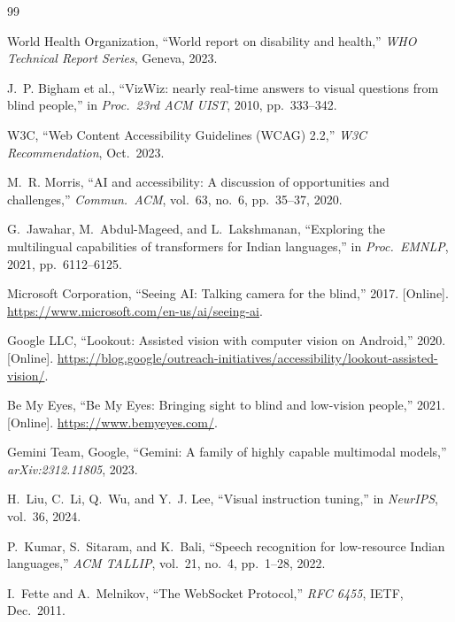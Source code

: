 \documentclass[pdflatex,sn-mathphys-num]{sn-jnl}
\theoremstyle{thmstyleone}%
\theoremstyle{thmstyletwo}%
\theoremstyle{thmstylethree}%
\begin{document}
\begin{thebibliography}{99}

World Health Organization, ``World report on disability and health,''
\textit{WHO Technical Report Series}, Geneva, 2023.

J.~P. Bigham et al., ``VizWiz: nearly real-time answers to visual questions
from blind people,'' in \textit{Proc.\ 23rd ACM UIST}, 2010, pp.\ 333--342.

W3C, ``Web Content Accessibility Guidelines (WCAG) 2.2,''
\textit{W3C Recommendation}, Oct.\ 2023.

M.~R. Morris, ``AI and accessibility: A discussion of opportunities and
challenges,'' \textit{Commun.\ ACM}, vol.\ 63, no.\ 6, pp.\ 35--37, 2020.

G.~Jawahar, M.~Abdul-Mageed, and L.~Lakshmanan, ``Exploring the multilingual
capabilities of transformers for Indian languages,'' in \textit{Proc.\ EMNLP},
2021, pp.\ 6112--6125.

Microsoft Corporation, ``Seeing AI: Talking camera for the blind,'' 2017.
[Online]. \url{https://www.microsoft.com/en-us/ai/seeing-ai}.

Google LLC, ``Lookout: Assisted vision with computer vision on Android,'' 2020.
[Online]. \url{https://blog.google/outreach-initiatives/accessibility/lookout-assisted-vision/}.

Be My Eyes, ``Be My Eyes: Bringing sight to blind and low-vision people,'' 2021.
[Online]. \url{https://www.bemyeyes.com/}.

Gemini Team, Google, ``Gemini: A family of highly capable multimodal models,''
\textit{arXiv:2312.11805}, 2023.

H.~Liu, C.~Li, Q.~Wu, and Y.~J. Lee, ``Visual instruction tuning,'' in
\textit{NeurIPS}, vol.\ 36, 2024.

P.~Kumar, S.~Sitaram, and K.~Bali, ``Speech recognition for low-resource Indian
languages,'' \textit{ACM TALLIP}, vol.\ 21, no.\ 4, pp.\ 1--28, 2022.

I.~Fette and A.~Melnikov, ``The WebSocket Protocol,'' \textit{RFC 6455},
IETF, Dec.\ 2011.


\end{thebibliography}
\end{document}
